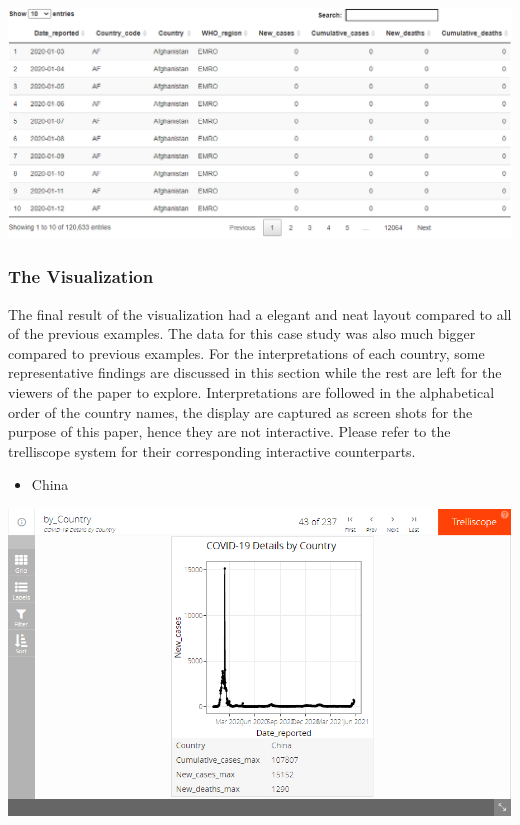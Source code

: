\documentclass[
]{article}
\providecommand{\tightlist}{%
  \setlength{\itemsep}{0pt}\setlength{\parskip}{0pt}}
\begin{document}
\includegraphics[width=1\linewidth,height=1\textheight]{datatable}

\hypertarget{the-visualization}{%
\subsubsection{The Visualization}\label{the-visualization}}

The final result of the visualization had a elegant and neat layout
compared to all of the previous examples. The data for this case study
was also much bigger compared to previous examples. For the
interpretations of each country, some representative findings are
discussed in this section while the rest are left for the viewers of the
paper to explore. Interpretations are followed in the alphabetical order
of the country names, the display are captured as screen shots for the
purpose of this paper, hence they are not interactive. Please refer to
the trelliscope system for their corresponding interactive counterparts.

\begin{itemize}
\tightlist
\item
  China
\end{itemize}

\includegraphics[width=1\linewidth,height=1\textheight]{China}
\end{document}
